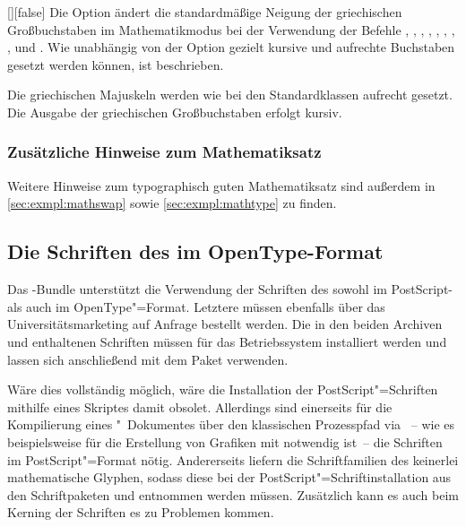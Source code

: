 \begin{Declaration}{[\PBoolean]}[false]
\printdeclarationlist%
%
%
%
Die Option ändert die standardmäßige Neigung der griechischen Großbuchstaben im 
Mathematikmodus bei der Verwendung der Befehle , , 
, , , , , 
,  und . Wie unabhängig von der Option 
 gezielt kursive und aufrechte Buchstaben gesetzt werden 
können, ist  beschrieben.
%
\begin{values}
\itemfalse
  Die griechischen Majuskeln werden wie bei den Standardklassen aufrecht 
  gesetzt.
\itemtrue*
  Die Ausgabe der griechischen Großbuchstaben erfolgt kursiv.
\end{values}
\end{Declaration}

\subsubsection{Zusätzliche Hinweise zum Mathematiksatz}
Weitere Hinweise zum typographisch guten Mathematiksatz sind außerdem in 
\autoref{sec:exmpl:mathswap} sowie \autoref{sec:exmpl:mathtype} zu finden.


\subsection{Die Schriften des \CDs im OpenType-Format}
\label{sec:fonts:fontspec}
%
Das \TUDScript-Bundle unterstützt die Verwendung der Schriften des \CDs sowohl 
im PostScript- als auch im OpenType"=Format. Letztere müssen ebenfalls über das 
%
{Universitätsmarketing auf Anfrage} bestellt werden. Die in den beiden Archiven 
 und  enthaltenen Schriften müssen 
für das Betriebssystem installiert werden und lassen sich anschließend mit dem 
Paket  verwenden.

Wäre dies vollständig möglich, wäre die Installation der PostScript"=Schriften 
mithilfe eines Skriptes damit obsolet. Allerdings sind einerseits für die 
Kompilierung eines "~Dokumentes über den klassischen Prozesspfad 
via ~-- wie es 
beispielsweise für die Erstellung von Grafiken mit  notwendig 
ist~-- die Schriften im PostScript"=Format nötig. Andererseits liefern die 
Schriftfamilien des \CDs keinerlei mathematische Glyphen, sodass diese bei der 
PostScript"=Schriftinstallation aus den Schriftpaketen  und 
 entnommen werden müssen. Zusätzlich kann es auch beim Kerning 
der Schriften es zu Problemen kommen.

